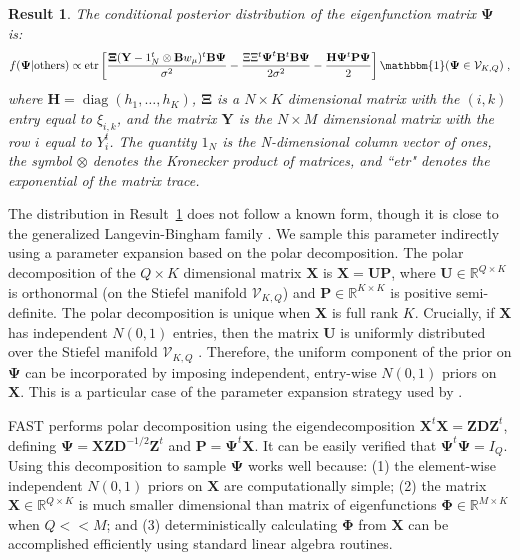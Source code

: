 \documentclass[12pt]{article}
\DeclareMathOperator{\diag}{diag}
\newtheorem{result}{Result}
\begin{document}
\begin{result} \label{Thm:EF}
The conditional posterior distribution of the eigenfunction matrix $\mathbf{\Psi}$ is:
$$ f(\mathbf{\Psi} |{\rm others}) \propto \text{\rm etr}\left[\frac{\mathbf{\Xi}(\mathbf{Y} - 1_N^t \otimes \mathbf{B}w_{\mu})^t\mathbf{B}\mathbf{\Psi}}{\sigma^2} - \frac{\Xi \Xi^t \boldsymbol{\Psi}^t \mathbf{B}^t \mathbf{B} \boldsymbol{\Psi}}{2\sigma^2} -\frac{\mathbf{H}\mathbf{\Psi}^t\mathbf{P}\mathbf{\Psi}}{2} \right] \mathbbm{1}(\mathbf{\Psi} \in \mathcal{V}_{K,Q})\;,$$
    where $\mathbf{H} = \diag(h_1, \ldots, h_K)$, $\mathbf{\Xi}$ is a $N\times K$ dimensional matrix with the $(i,k)$ entry equal to $\xi_{i,k}$, and the matrix $\mathbf{Y}$ is the $N\times M$ dimensional matrix with the row $i$ equal to $Y_i^t$. The quantity $1_N$ is the N-dimensional column vector of ones, the symbol $\otimes$ denotes the Kronecker product of matrices, and ``etr" denotes the exponential of the matrix trace.
\end{result}

The distribution in Result~\ref{Thm:EF} does not follow a known form, though it is close to the generalized Langevin-Bingham family \citep{hoff_simulation_2009}. We sample this parameter indirectly using a parameter expansion based on the polar decomposition. The polar decomposition of the $Q\times K$ dimensional matrix  $\mathbf{X}$ is $\mathbf{X} = \mathbf{U P}$, where $\mathbf{U} \in \mathbb{R}^{Q \times K}$ is orthonormal (on the Stiefel manifold $\mathcal{V}_{K,Q}$) and $\mathbf{P} \in \mathbb{R}^{K \times K}$ is positive semi-definite. The polar decomposition is unique when $\mathbf{X}$ is full rank $K$. Crucially, if $\mathbf{X}$ has independent $N(0,1)$ entries, then the matrix $\mathbf{U}$ is uniformly distributed over the Stiefel manifold $\mathcal{V}_{K,Q}$ \citep{chikuse_statistics_2003}. Therefore, the uniform component of the prior on $\boldsymbol{\Psi}$ can be incorporated by imposing independent, entry-wise $N(0,1)$ priors on  $\mathbf{X}$. This is a particular case of the parameter expansion strategy used by \cite{jauch_monte_2021,park_bayesian_2025,meng_bayesian_2024}.

FAST performs polar decomposition using the eigendecomposition $\mathbf{X}^t\mathbf{X}=\mathbf{ZDZ}^t$, defining $\mathbf{\Psi}=\mathbf{XZD}^{-1/2}\mathbf{Z}^t$ and $\mathbf{P}=\mathbf{\Psi}^t\mathbf{X}$. It can be easily verified that $\mathbf{\Psi}^t\mathbf{\Psi}=I_Q$. Using this decomposition to sample $\mathbf{\Psi}$ works well because: (1) the element-wise independent $N(0,1)$ priors on $\mathbf{X}$ are computationally simple; (2) the matrix $\mathbf{X} \in \mathbb{R}^{Q \times K}$ is much smaller dimensional than matrix of eigenfunctions $\mathbf{\Phi} \in \mathbb{R}^{M \times K}$ when $Q<<M$; and (3) deterministically calculating $\mathbf{\Phi}$ from $\mathbf{X}$ can be accomplished efficiently using standard linear algebra routines.
\end{document}
